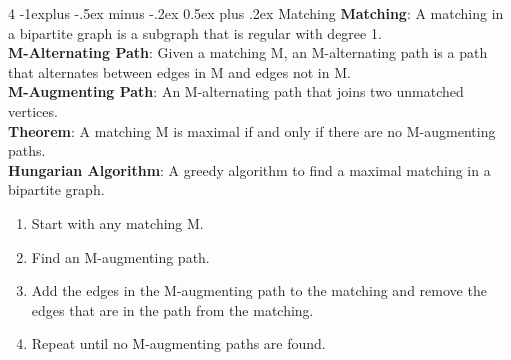 \documentclass[letterpaper, 8pt]{extarticle}
\makeatletter
\renewcommand{\section}{\@startsection{section}{1}{0mm}%
	{-1explus -.5ex minus -.2ex}%
	{0.5ex plus .2ex}%
	{\normalfont\normalsize\bfseries}}
\makeatother
\begin{document}
\begin{multicols*}{4}
	\section{Matching}
	\textbf{Matching}: A matching in a bipartite graph is a subgraph that is regular with degree 1. \\
	\textbf{M-Alternating Path}: Given a matching M, an M-alternating path is a path that alternates between edges in M and edges not in M. \\
	\textbf{M-Augmenting Path}: An M-alternating path that joins two unmatched vertices. \\
	\textbf{Theorem}: A matching M is maximal if and only if there are no M-augmenting paths. \\
	\textbf{Hungarian Algorithm}: A greedy algorithm to find a maximal matching in a bipartite graph.
	\begin{enumerate}
		\item Start with any matching M.
		\item Find an M-augmenting path.
		\item Add the edges in the M-augmenting path to the matching and remove the edges that are in the path from the matching.
		\item Repeat until no M-augmenting paths are found.
	\end{enumerate}

\end{multicols*}
\end{document}
